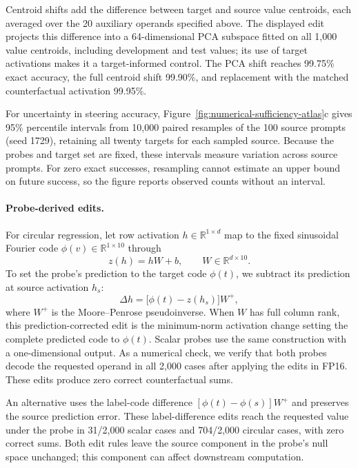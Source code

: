 \documentclass[11pt]{article}
\begin{document}
Centroid shifts add the difference between target and source value centroids, each averaged over the 20 auxiliary operands specified above.
The displayed edit projects this difference into a 64-dimensional PCA subspace fitted on all 1,000 value centroids, including development and test values; its use of target activations makes it a target-informed control.
The PCA shift reaches 99.75\% exact accuracy, the full centroid shift 99.90\%, and replacement with the matched counterfactual activation 99.95\%.

For uncertainty in steering accuracy, Figure~\ref{fig:numerical-sufficiency-atlas}c gives 95\% percentile intervals from 10,000 paired resamples of the 100 source prompts (seed 1729), retaining all twenty targets for each sampled source.
Because the probes and target set are fixed, these intervals measure variation across source prompts.
For zero exact successes, resampling cannot estimate an upper bound on future success, so the figure reports observed counts without an interval.

\paragraph{Probe-derived edits.}
\label{sec:numerical-probe-geometry}

For circular regression, let row activation $h\in\mathbb{R}^{1\times d}$ map to the fixed sinusoidal Fourier code $\phi(v)\in\mathbb{R}^{1\times 10}$ through
\begin{equation}
 z(h)=hW+b,\qquad W\in\mathbb{R}^{d\times 10}.
\end{equation}
To set the probe's prediction to the target code $\phi(t)$, we subtract its prediction at source activation $h_s$:
\begin{equation}
 \Delta h=\bigl[\phi(t)-z(h_s)\bigr]W^{+},
\end{equation}
where $W^{+}$ is the Moore--Penrose pseudoinverse.
When $W$ has full column rank, this prediction-corrected edit is the minimum-norm activation change setting the complete predicted code to $\phi(t)$.
Scalar probes use the same construction with a one-dimensional output.
As a numerical check, we verify that both probes decode the requested operand in all 2,000 cases after applying the edits in FP16.
These edits produce zero correct counterfactual sums.

An alternative uses the label-code difference $[\phi(t)-\phi(s)]W^{+}$ and preserves the source prediction error.
These label-difference edits reach the requested value under the probe in 31/2,000 scalar cases and 704/2,000 circular cases, with zero correct sums.
Both edit rules leave the source component in the probe's null space unchanged; this component can affect downstream computation.
\end{document}

